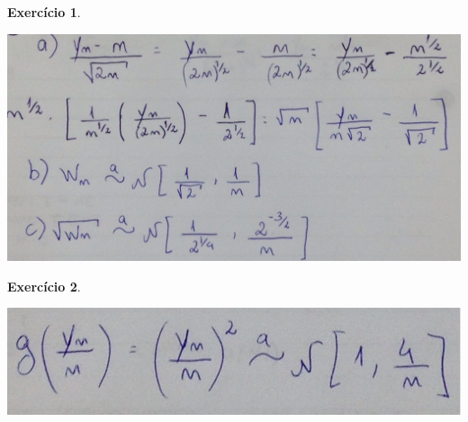 \documentclass[letter,11pt]{article}
\newtheorem{exer}{Exercício}
\begin{document}
\begin{exer} \rm
\end{exer}
\includegraphics[scale=0.4]{gabarito_ex15_lista7.jpg}


\begin{exer} \rm
\end{exer}
\includegraphics[scale=0.4]{gabarito_ex16_lista7.jpg}
\end{document}
